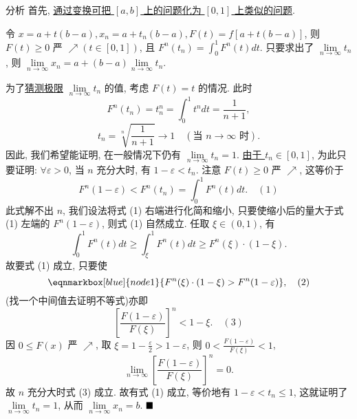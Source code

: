\documentclass[lang=cn,newtx,10pt,scheme=chinese]{elegantbook}
\begin{document}
\begin{solution}
分析 首先, \underline{通过变换可把 $[a,b]$ 上的问题化为 $[0,1]$ 上类似的问题}. 

令 $x = a + t(b-a), x_n = a + t_n(b-a), F(t) = f[a+t(b-a)]$, 则 $F(t) \ge 0$ 严 $\nearrow (t \in [0,1])$, 且 $F^n(t_n) = \int_0^1 F^n(t) dt$. 只要求出了 $\lim\limits_{n \to \infty} t_n$, 则 $\lim\limits_{n \to \infty} x_n = a + (b-a) \lim\limits_{n \to \infty} t_n$.

为了\underline{猜测极限} $\lim\limits_{n \to \infty} t_n$ 的值, 考虑 $F(t) = t$ 的情况. 此时
$$ F^n(t_n) = t_n^n = \int_0^1 t^n dt = \frac{1}{n+1}, $$
$$ t_n = \sqrt[n]{\frac{1}{n+1}} \to 1 \quad (\text{当 } n \to \infty \text{ 时}). $$
因此, 我们希望能证明, 在一般情况下仍有 $\lim\limits_{n \to \infty} t_n = 1$. \underline{由于 $t_n \in [0,1]$}, 为此只要证明:
$\forall \varepsilon > 0$, 当 $n$ 充分大时, 有 $1-\varepsilon < t_n$. 注意 $F(t) \ge 0$ 严 $\nearrow$, 这等价于
$$ F^n(1-\varepsilon) < F^n(t_n) = \int_0^1 F^n(t) dt. \quad (1) $$
此式解不出 $n$, 我们设法将式 (1) 右端进行化简和缩小, 只要使缩小后的量大于式 (1) 左端的 $F^n(1-\varepsilon)$, 则式 (1) 自然成立. 任取 $\xi \in (0,1)$, 有
$$ \int_0^1 F^n(t) dt \ge \int_\xi^1 F^n(t) dt \ge F^n(\xi) \cdot (1-\xi). $$
故要式 (1) 成立, 只要使
\begin{equation*}
    \eqnmarkbox[blue]{node1}{F^n(\xi) \cdot (1-\xi) > F^n(1-\varepsilon)}, \quad (2) 
\end{equation*}
(找一个中间值去证明不等式)亦即
$$ \left[ \frac{F(1-\varepsilon)}{F(\xi)} \right]^n < 1-\xi. \quad (3) $$
因 $0 \le F(x)$ 严 $\nearrow$, 取 $\xi = 1 - \frac{\varepsilon}{2} > 1-\varepsilon$, 则 $0 < \frac{F(1-\varepsilon)}{F(\xi)} < 1$,
$$ \lim\limits_{n \to \infty} \left[ \frac{F(1-\varepsilon)}{F(\xi)} \right]^n = 0. $$
故 $n$ 充分大时式 (3) 成立. 故有式 (1) 成立, 等价地有 $1-\varepsilon < t_n \le 1$, 这就证明了 $\lim\limits_{n \to \infty} t_n = 1$, 从而 $\lim\limits_{n \to \infty} x_n = b$. $\hfill \blacksquare$
\end{solution}
\end{document}
